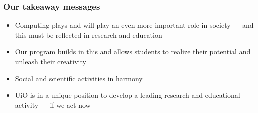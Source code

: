 \documentclass{beamer}
\begin{document}
\begin{frame}
\frametitle{Our takeaway messages}

\begin{block}{}
\begin{itemize}
\item Computing plays and will play an even more important role in society --– and this must be reflected in research and education

\item Our program builds in this and allows students to realize their potential and unleash their creativity

\item Social and scientific activities in harmony

\item UiO is in a unique position to develop a leading research and educational activity --- if we act now
\end{itemize}

\noindent
\end{block}
\end{frame}
\end{document}
